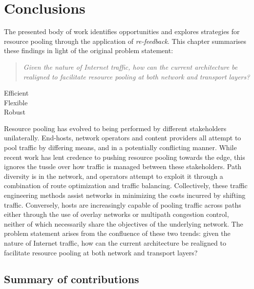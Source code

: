 \chapter{Conclusions}
\label{chapter:conclusions}

The presented body of work identifies opportunities and explores strategies for resource pooling through the application of \emph{re-feedback}.
This chapter summarises these findings in light of the original problem statement:

\begin{quote}
\textit{
Given the nature of Internet traffic, how can the current architecture be realigned to facilitate resource pooling at both network and transport layers?
}
\end{quote}

\renewcommand{\descriptionlabel}[1]{\hspace{\labelsep}\textbf{#1}}
\begin{description}
\item[Efficient]
\LOREM
\item[Flexible]
\LOREM
\item[Robust]
\LOREM
\end{description}

Resource pooling has evolved to being performed by different stakeholders unilaterally.
End-hosts, network operators and content providers all attempt to pool traffic by differing means, and in a potentially conflicting manner.
While recent work has lent credence to pushing resource pooling towards the edge, this ignores the tussle over how traffic is managed between these stakeholders.
Path diversity is in the network, and operators attempt to exploit it through a combination of route optimization and traffic balancing.
Collectively, these traffic engineering methods assist networks in minimizing the costs incurred by shifting traffic.
Conversely, hosts are increasingly capable of pooling traffic across paths either through the use of overlay networks or multipath congestion control, neither of which necessarily share the objectives of the underlying network.
The problem statement arises from the confluence of these two trends: given the nature of Internet traffic, how can the current architecture be realigned to facilitate resource pooling at both network and transport layers?

\section{Summary of contributions}

